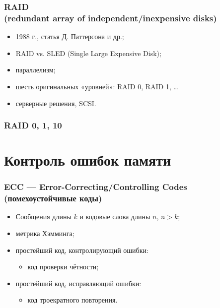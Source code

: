 \begin{frame}
\frametitle{RAID\\(redundant array of independent/inexpensive disks)}
\begin{itemize}[<+->]
    \item 1988 г., статья Д. Паттерсона и др.;
    \item RAID vs. SLED (Single Large Expensive Disk);
    \item параллелизм;
    \item шесть оригинальных «уровней»: RAID 0, RAID 1, …
    \item серверные решения, SCSI.
\end{itemize}
\end{frame}

\begin{frame}
\frametitle{RAID 0, 1, 10}
\end{frame}

\section {Контроль ошибок памяти}

\begin{frame}
\frametitle{ECC — Error-Correcting/Controlling Codes (помехоустойчивые коды)}


\begin{itemize}%
    \item Сообщения длины $k$ и кодовые слова длины $n$, $n > k$;

    \item метрика Хэмминга; %

    \item простейший код, контролирующий ошибки:
    \begin{itemize}
        \item код проверки чётности;
    \end{itemize}

    \item простейший код, исправляющий ошибки:
    \begin{itemize}
        \item код троекратного повторения.
    \end{itemize}
\end{itemize}
\end{frame}




